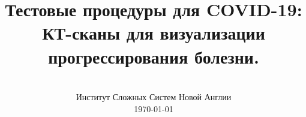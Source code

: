 \documentclass[onecolumn,journal]{IEEEtran}
\begin{document}
\title{\color{Brown} Тестовые процедуры для COVID-19: \\ КТ-сканы для визуализации прогрессирования болезни.  \\
\vspace{-0.35ex}}
\author{\\ Институт Сложных Систем Новой Англии \\
 \today 
  \vspace{-14ex} \\ 

   
\bigskip
\bigskip

\textbf{}
 }
    
\maketitle


\flushbottom %



\thispagestyle{empty} %




\renewcommand{\thefootnote}{\fnsymbol{footnote}}
\end{document}
